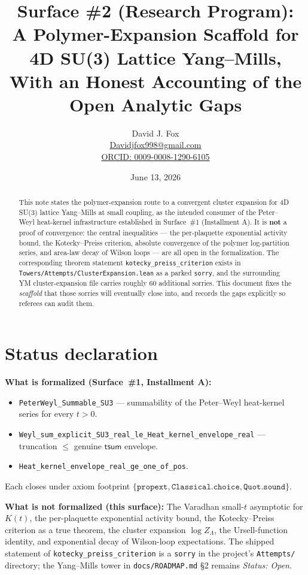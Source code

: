\documentclass{article}
\title{Surface \#2 (Research Program):\\
A Polymer-Expansion Scaffold for 4D SU(3) Lattice Yang--Mills,\\
With an Honest Accounting of the Open Analytic Gaps}
\author{David J. Fox \\
\href{mailto:Davidjfox998@gmail.com}{Davidjfox998@gmail.com} \\
\href{https://orcid.org/0009-0008-1290-6105}{ORCID: 0009-0008-1290-6105}}
\date{June 13, 2026}
\begin{document}
\maketitle

\begin{abstract}
This note states the polymer-expansion route to a convergent cluster
expansion for 4D SU(3) lattice Yang--Mills at small coupling, as the
intended consumer of the Peter--Weyl heat-kernel infrastructure
established in Surface~\#1 (Installment A). It is \textbf{not} a
proof of convergence: the central inequalities --- the per-plaquette
exponential activity bound, the Kotecky--Preiss criterion, absolute
convergence of the polymer log-partition series, and area-law decay
of Wilson loops --- are all open in the formalization. The
corresponding theorem statement \texttt{kotecky\_preiss\_criterion}
exists in \texttt{Towers/Attempts/ClusterExpansion.lean} as a
parked \texttt{sorry}, and the surrounding YM cluster-expansion file
carries roughly 60 additional sorries. This document fixes the
\emph{scaffold} that those sorries will eventually close into, and
records the gaps explicitly so referees can audit them.
\end{abstract}

\section{Status declaration}

\noindent\textbf{What is formalized (Surface~\#1, Installment A):}
\begin{itemize}
  \item \texttt{PeterWeyl\_Summable\_SU3} --- summability of the
        Peter--Weyl heat-kernel series for every $t>0$.
  \item \texttt{Weyl\_sum\_explicit\_SU3\_real\_le\_Heat\_kernel\_envelope\_real}
        --- truncation $\le$ genuine $\mathsf{tsum}$ envelope.
  \item \texttt{Heat\_kernel\_envelope\_real\_ge\_one\_of\_pos}.
\end{itemize}
Each closes under axiom footprint
$\{\texttt{propext}, \texttt{Classical.choice}, \texttt{Quot.sound}\}$.

\noindent\textbf{What is not formalized (this surface):}
The Varadhan small-$t$ asymptotic for $K(t)$, the per-plaquette
exponential activity bound, the Kotecky--Preiss criterion as a true
theorem, the cluster expansion $\log Z_\Lambda$, the Ursell-function
identity, and exponential decay of Wilson-loop expectations. The
shipped statement of \texttt{kotecky\_preiss\_criterion} is a
\texttt{sorry} in the project's \texttt{Attempts/} directory; the
Yang--Mills tower in \texttt{docs/ROADMAP.md} \S2 remains
\emph{Status: Open}.
\end{document}
